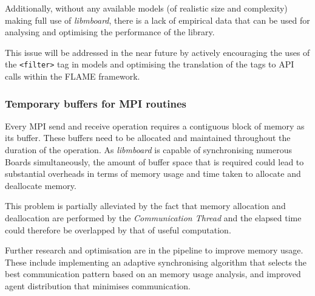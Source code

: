 Additionally, without any available models (of realistic size and complexity) making full use of \textit{libmboard}, there is a lack of empirical data that can be used for analysing and optimising the performance of the library. 

This issue will be addressed in the near future by actively encouraging the uses of the \texttt{<filter>} tag in models and optimising the translation of the tags to API calls within the FLAME framework.


\subsubsection{Temporary buffers for MPI routines}

Every MPI send and receive operation requires a contiguous block of memory as its buffer. These buffers need to be allocated and maintained throughout the duration of the operation. As \textit{libmboard} is capable of synchronising numerous Boards simultaneously, the amount of buffer space that is required could lead to substantial overheads in terms of memory usage and time taken to allocate and deallocate memory. 

This problem is partially alleviated by the fact that memory allocation and deallocation are performed by the \textit{Communication Thread} and the elapsed time could therefore be overlapped by that of useful computation.

Further research and optimisation are in the pipeline to improve memory usage. These include implementing an adaptive synchronising algorithm that selects the best communication pattern based on an memory usage analysis, and improved agent distribution that minimises communication.


